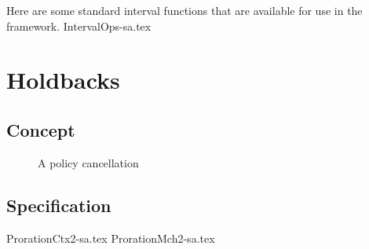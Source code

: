 Here are some standard interval functions that are available for use in the framework.
{IntervalOps-sa.tex}

\section{Holdbacks}
\label{sec:03:3}
\subsection{Concept}

\begin{figure}[b]
  \begin{tikzpicture}[->,>=stealth']
    \end{tikzpicture}
  \caption{
    A policy cancellation
  }
  \label{fig:3:1}
\end{figure}

\subsection{Specification}
{ProrationCtx2-sa.tex}
{ProrationMch2-sa.tex}

